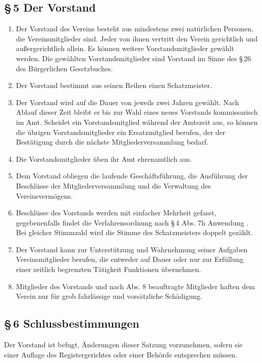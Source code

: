 \documentclass[12pt,a4paper]{article}
\begin{document}
\subsection*{§\,5 Der Vorstand}
\begin{enumerate}
\item Der Vorstand des Vereins besteht aus mindestens zwei natürlichen Personen, die Vereinsmitglieder sind. Jeder von ihnen vertritt den Verein gerichtlich und außergerichtlich allein. Es können weitere Vorstandsmitglieder gewählt werden. Die gewählten Vorstandsmitglieder sind Vorstand im Sinne des §\,26 des Bürgerlichen Gesetzbuches.
\item Der Vorstand bestimmt aus seinen Reihen einen Schatzmeister.
\item Der Vorstand wird auf die Dauer von jeweils zwei Jahren gewählt. Nach Ablauf dieser Zeit bleibt er bis zur Wahl eines neues Vorstands kommissarisch im Amt. Scheidet ein Vorstandsmitglied während der Amtszeit aus, so können die übrigen Vorstandsmitglieder ein Ersatzmitglied berufen, der der Bestätigung durch die nächste Mitgliederversammlung bedarf.
\item Die Vorstandsmitglieder üben ihr Amt ehrenamtlich aus.
\item Dem Vorstand obliegen die laufende Geschäftsführung, die Ausführung der Beschlüsse der Mitgliederversammlung und die Verwaltung des Vereinsvermögens.
\item Beschlüsse des Vorstands werden mit einfacher Mehrheit gefasst, gegebenenfalls findet die Verfahrensordnung nach §\,4 Abs. 7h Anwendung . Bei gleicher Stimmzahl wird die Stimme des Schatzmeisters doppelt gezählt.
\item Der Vorstand kann zur Unterstützung und Wahrnehmung seiner Aufgaben Vereinsmitglieder berufen, die entweder auf Dauer oder nur zur Erfüllung einer zeitlich begrenzten Tätigkeit Funktionen übernehmen.
\item Mitglieder des Vorstands und nach Abs. 8 beauftragte Mitglieder haften dem Verein nur für grob fahrlässige und vorsätzliche Schädigung.
\end{enumerate}

\subsection*{§\,6 Schlussbestimmungen}
Der Vorstand ist befugt, Änderungen dieser Satzung vorzunehmen, sofern sie einer
Auflage des Registergerichtes oder einer Behörde entsprechen müssen.
\end{document}
